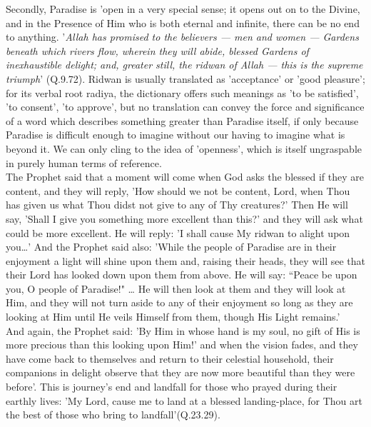 \documentclass[10pt, twoside,openright]{book}
\begin{document}
Secondly, Paradise is 'open in a very special sense; it opens out on to the Divine, and in the 
Presence of Him who is both eternal and infinite, there can be no end to anything. '\emph{Allah has 
promised to the believers --- men and women --- Gardens beneath which rivers flow, wherein they will 
abide, blessed Gardens of inexhaustible delight; and, greater still, the ridwan of Allah --- this is 
the supreme triumph}' (Q.9.72). Ridwan is usually translated as 'acceptance' or 'good pleasure'; for 
its verbal root radiya, the dictionary offers such meanings as 'to be satisfied', 'to consent', 'to 
approve', but no translation can convey the force and significance of a word which describes 
something greater than Paradise itself, if only because Paradise is difficult enough to imagine 
without our having to imagine what is beyond it. We can only cling to the idea of 'openness', which 
is itself ungraspable in purely human terms of reference. \\

The Prophet said that a moment will come when God asks the blessed if they are content, and they will 
reply, 'How should we not be content, Lord, when Thou has given us what Thou didst not give to any of 
Thy creatures?' Then He will say, 'Shall I give you something more excellent than this?' and they 
will ask what could be more excellent. He will reply: 'I shall cause My ridwan to alight upon you\ldots{}' 
And the Prophet said also: 'While the people of Paradise are in their enjoyment a light will shine 
upon them and, raising their heads, they will see that their Lord has looked down upon them from 
above. He will say: ``Peace be upon you, O people of Paradise!" \ldots{} He will then look at them and they 
will look at Him, and they will not turn aside to any of their enjoyment so long as they are looking 
at Him until He veils Himself from them, though His Light remains.' \\

And again, the Prophet said: 'By Him in whose hand is my soul, no gift of His is more precious than 
this looking upon Him!' and when the vision fades, and they have come back to themselves and return 
to their celestial household, their companions in delight observe that they are now more beautiful 
than they were before'. This is journey's end and landfall for those who prayed during their earthly 
lives: 'My Lord, cause me to land at a blessed landing-place, for Thou art the best of those who 
bring to landfall'(Q.23.29). \\
\end{document}
